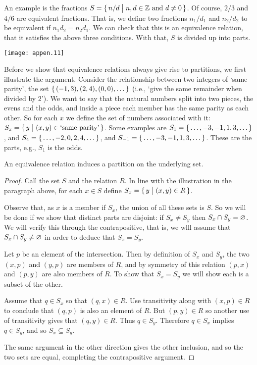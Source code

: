An example is the fractions 
$S=\mbox{$\{\,n/d\bigm| \text{$n,d\in\mathbb{Z}$ and $d\neq 0$}\,\}$}$.
Of course, $2/3$ and $4/6$ are equivalent fractions.
That is,
we define two fractions $n_1/d_1$ and $n_2/d_2$ 
to be equivalent if $n_1d_2=n_2d_1$.
We can check that this is an equivalence relation, that
it satisfies the above three conditions.
With that, $S$ is divided up into parts.
\begin{center}
  \texttt{[image: appen.11]}
\end{center}

Before we show that equivalence relations always give rise to
partitions, we first illustrate the argument.
Consider the relationship between two integers of `same parity', 
the set \( \mbox{$\{\, (-1,3),(2,4),(0,0),\ldots\,\}$} \)
(i.e., `give the same remainder when divided by \( 2 \)').
We want to say that the natural numbers split into two pieces,
the evens and the odds, and inside a piece each member has the same
parity as each other.
So for each \( x \) we define the set of numbers associated with
it: \( S_x=\set{y\suchthat (x,y)\in\text{`same\ parity'}} \).
Some examples are
\( S_1=\mbox{$\{\,\ldots,-3,-1,1,3,\ldots\,\}$} \), and
\( S_4=\mbox{$\{\,\ldots,-2,0,2,4,\ldots\,\}$} \), and
\( S_{-1}=\mbox{$\{\,\ldots,-3,-1,1,3,\ldots\,\}$} \).
These are the parts, e.g., \( S_1 \) is the odds.

\medskip
\par{}
An equivalence relation induces a partition on the underlying set.

\begin{proof}
Call the set \( S \) and the relation \( R \).
In line with the illustration in the paragraph above, 
for each \( x\in S \) define \( S_x=\mbox{$\{\,y\bigm| (x,y)\in R\,\}$} \).

Observe that, as \( x \) is a member if \( S_x \),
the union of all these sets is \( S \).
So we will be done if we show that distinct parts are disjoint:
if \( S_x\neq S_y \) then \( S_x\cap S_y=\varnothing \).
We will verify this through the contrapositive, that is, 
we wlll assume that \( S_x\cap S_y\neq\varnothing \) in order to
deduce that \( S_x=S_y \).

Let \( p \) be an element of the intersection. 
Then by definition of $S_x$ and $S_y$, the two 
\( (x,p) \) and 
\( (y,p) \) are members of $R$, and by symmetry of this relation
\( (p,x) \) and
\( (p,y) \) are also members of \( R \).
To show that \( S_x=S_y \) we will show each is a subset of the other.

Assume that \( q\in S_x \) so that \( (q,x)\in R \).
Use transitivity along with
\( (x,p)\in R \) to conclude that \( (q,p) \) is also an element of \( R \).
But \( (p,y)\in R \) so another use of transitivity gives that
\( (q,y)\in  R \).
Thus \( q\in S_y \).
Therefore \( q\in S_x \) implies \( q\in S_y \), 
and so \( S_x\subseteq S_y \).

The same argument in the other direction gives the other inclusion, and
so the two sets are equal, completing the contrapositive argument. 
\end{proof}


